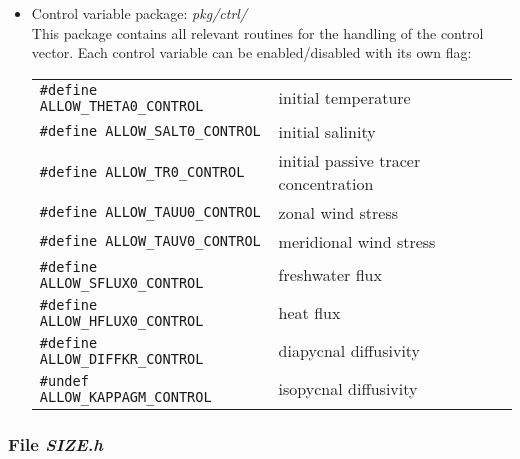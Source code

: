\begin{itemize}
(see Section \ref{???}). \\
\hspace*{4ex} {\tt \#define ALLOW\_COST} \\
enables all general aspects of the cost function handling,
in particular the hooks in the forward code for
initializing, accumulating and finalizing the cost function. \\
\hspace*{4ex} {\tt \#define ALLOW\_COST\_TRACER} \\
includes the call to the cost function for this
particular experiment, eqn. (\ref{cost_tracer}).
%
\item Control variable package: {\it pkg/ctrl/} \\
This package contains all relevant routines for
the handling of the control vector.
Each control variable can be enabled/disabled with its own flag: \\
\begin{tabular}{ll}
\hspace*{2ex} {\tt \#define ALLOW\_THETA0\_CONTROL} & 
initial temperature \\
\hspace*{2ex} {\tt \#define ALLOW\_SALT0\_CONTROL} & 
initial salinity \\
\hspace*{2ex} {\tt \#define ALLOW\_TR0\_CONTROL} & 
initial passive tracer concentration \\
\hspace*{2ex} {\tt \#define ALLOW\_TAUU0\_CONTROL} & 
zonal wind stress \\
\hspace*{2ex} {\tt \#define ALLOW\_TAUV0\_CONTROL} & 
meridional wind stress \\
\hspace*{2ex} {\tt \#define ALLOW\_SFLUX0\_CONTROL} & 
freshwater flux \\
\hspace*{2ex} {\tt \#define ALLOW\_HFLUX0\_CONTROL} & 
heat flux \\
\hspace*{2ex} {\tt \#define ALLOW\_DIFFKR\_CONTROL} & 
diapycnal diffusivity \\
\hspace*{2ex} {\tt \#undef ALLOW\_KAPPAGM\_CONTROL} & 
isopycnal diffusivity \\
\end{tabular}
%
\end{itemize}

\subsubsection{File {\it SIZE.h}}

